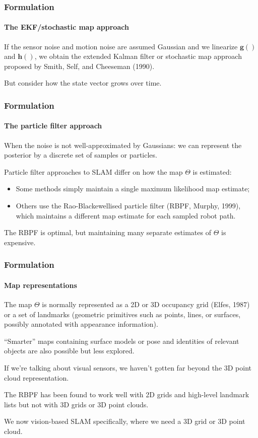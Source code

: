 \documentclass[aspectratio=169]{beamer}
\renewcommand{\vec}[1]{\boldsymbol{#1}}
\begin{document}
\begin{frame}
\frametitle{Formulation}
\framesubtitle{The EKF/stochastic map approach}

If the sensor noise and motion noise are assumed \alert{Gaussian} and
we \alert{linearize} $\vec{g}()$ and $\vec{h}()$, we obtain
the \alert{extended Kalman filter} or \alert{stochastic map} approach
proposed by Smith, Self, and Cheeseman (1990).

\medskip

But consider how the state vector grows over time.

\end{frame}


\begin{frame}
\frametitle{Formulation}
\framesubtitle{The particle filter approach}

When the noise is not well-approximated by Gaussians: we can represent
the posterior by a discrete set of \alert{samples} or
\alert{particles}.

\medskip

Particle filter approaches to SLAM differ on how the map $\Theta$ is
estimated:
\begin{itemize}
\item Some methods simply maintain a single maximum likelihood map estimate;
\item Others use the Rao-Blackewellised particle filter (RBPF, Murphy,
        1999), which maintains a \alert{different map} estimate \alert{for
    each sampled robot path}.
\end{itemize}

The RBPF is optimal, but maintaining many separate estimates of $\Theta$ is
expensive.

\end{frame}


\begin{frame}
\frametitle{Formulation}
\framesubtitle{Map representations}

The map $\Theta$ is normally represented as a 2D or 3D \alert{occupancy grid}
(Elfes, 1987) or a set of \alert{landmarks} (geometric primitives such as
points, lines, or surfaces, possibly annotated with appearance information).

\medskip

``Smarter'' maps containing \alert{surface models} or \alert{pose and
  identities of relevant objects} are also possible but less explored.

\medskip

If we're talking about visual sensors, we haven't gotten far beyond
the \alert{3D point cloud} representation.

\medskip

The RBPF has been found to work well with 2D grids and high-level
landmark lists but not with 3D grids or 3D point clouds.

\bigskip

We now vision-based SLAM specifically, where we need a 3D grid or
3D point cloud.

\end{frame}
\end{document}
